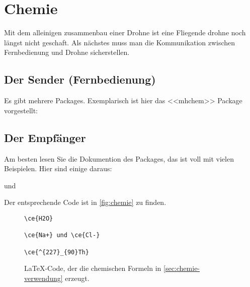\chapter{Chemie}\label{sec:chemie}
Mit dem alleinigen zusammenbau einer Drohne ist eine Fliegende drohne noch längst nicht geschaft. Als nächstes muss man die Kommunikation zwischen Fernbedienung und Drohne sicherstellen.  



\section{Der Sender (Fernbedienung)}
Es gibt mehrere Packages. Exemplarisch ist hier das <<mhchem>>\cite{mhchem}
Package vorgestellt:


\section{Der Empfänger} \label{sec:chemie-verwendung}
Am besten lesen Sie die Dokumention des Packages, das ist voll mit vielen
Beispielen. Hier sind einige daraus:


 und 


Der entsprechende Code ist in \autoref{fig:chemie} zu finden.

\begin{figure}[ht]
\centering
\begin{minipage}{0.8\textwidth}
\begin{verbatim}
\ce{H2O}

\ce{Na+} und \ce{Cl-}

\ce{^{227}_{90}Th}
\end{verbatim}
\end{minipage}
\caption{\LaTeX{}-Code, der die chemischen Formeln in
	\autoref{sec:chemie-verwendung}
erzeugt.}
\label{fig:chemie}
\end{figure}
